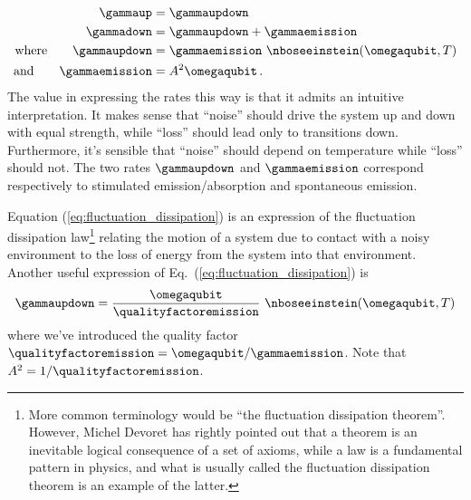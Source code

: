 \begin{align}
  \gammaup &= \gammaupdown \\
  \gammadown &= \gammaupdown + \gammaemission \\
  \text{where} \qquad
  \gammaupdown &= \gammaemission ~ \nboseeinstein(\omegaqubit, T) \label{eq:fluctuation_dissipation} \\
  \text{and} \qquad
  \gammaemission &= A^2 \omegaqubit
  \, .
\end{align}
The value in expressing the rates this way is that it admits an intuitive interpretation.
It makes sense that ``noise'' should drive the system up and down with equal strength, while ``loss'' should lead only to transitions down.
Furthermore, it's sensible that ``noise'' should depend on temperature while ``loss'' should not.
The two rates $\gammaupdown$ and $\gammaemission$ correspond respectively to stimulated emission/absorption and spontaneous emission.

Equation (\ref{eq:fluctuation_dissipation}) is an expression of the fluctuation dissipation law\footnote{More common terminology would be ``the fluctuation dissipation theorem''. However, Michel Devoret has rightly pointed out that a theorem is an inevitable logical consequence of a set of axioms, while a law is a fundamental pattern in physics, and what is usually called the fluctuation dissipation theorem is an example of the latter.} relating the motion of a system due to contact with a noisy environment to the loss of energy from the system into that environment.
Another useful expression of Eq.~(\ref{eq:fluctuation_dissipation}) is
\begin{equation}
  \gammaupdown = \frac{\omegaqubit}{\qualityfactoremission} ~ \nboseeinstein(\omegaqubit, T)
  \label{eq:fluctuation_dissipation_quality_factor}
\end{equation}
where we've introduced the quality factor $\qualityfactoremission = \omegaqubit / \gammaemission$.
Note that $A^2 = 1 / \qualityfactoremission$.
